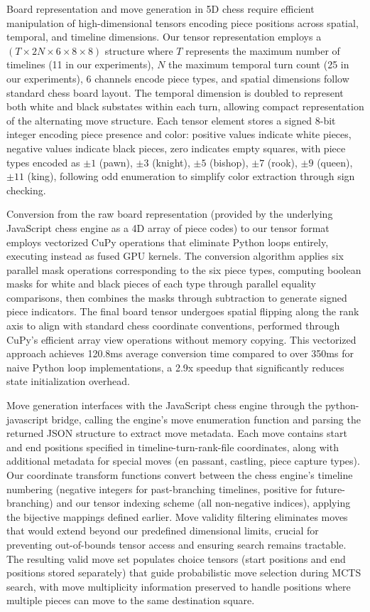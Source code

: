 \documentclass{article}
\begin{document}
Board representation and move generation in 5D chess require efficient manipulation of high-dimensional tensors encoding piece positions across spatial, temporal, and timeline dimensions. Our tensor representation employs a $(T \times 2N \times 6 \times 8 \times 8)$ structure where $T$ represents the maximum number of timelines (11 in our experiments), $N$ the maximum temporal turn count (25 in our experiments), 6 channels encode piece types, and spatial dimensions follow standard chess board layout. The temporal dimension is doubled to represent both white and black substates within each turn, allowing compact representation of the alternating move structure. Each tensor element stores a signed 8-bit integer encoding piece presence and color: positive values indicate white pieces, negative values indicate black pieces, zero indicates empty squares, with piece types encoded as $\pm 1$ (pawn), $\pm 3$ (knight), $\pm 5$ (bishop), $\pm 7$ (rook), $\pm 9$ (queen), $\pm 11$ (king), following odd enumeration to simplify color extraction through sign checking.

Conversion from the raw board representation (provided by the underlying JavaScript chess engine as a 4D array of piece codes) to our tensor format employs vectorized CuPy operations that eliminate Python loops entirely, executing instead as fused GPU kernels. The conversion algorithm applies six parallel mask operations corresponding to the six piece types, computing boolean masks for white and black pieces of each type through parallel equality comparisons, then combines the masks through subtraction to generate signed piece indicators. The final board tensor undergoes spatial flipping along the rank axis to align with standard chess coordinate conventions, performed through CuPy's efficient array view operations without memory copying. This vectorized approach achieves 120.8ms average conversion time compared to over 350ms for naive Python loop implementations, a 2.9x speedup that significantly reduces state initialization overhead.

Move generation interfaces with the JavaScript chess engine through the python-javascript bridge, calling the engine's move enumeration function and parsing the returned JSON structure to extract move metadata. Each move contains start and end positions specified in timeline-turn-rank-file coordinates, along with additional metadata for special moves (en passant, castling, piece capture types). Our coordinate transform functions convert between the chess engine's timeline numbering (negative integers for past-branching timelines, positive for future-branching) and our tensor indexing scheme (all non-negative indices), applying the bijective mappings defined earlier. Move validity filtering eliminates moves that would extend beyond our predefined dimensional limits, crucial for preventing out-of-bounds tensor access and ensuring search remains tractable. The resulting valid move set populates choice tensors (start positions and end positions stored separately) that guide probabilistic move selection during MCTS search, with move multiplicity information preserved to handle positions where multiple pieces can move to the same destination square.
\end{document}
